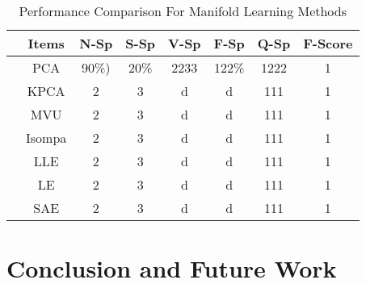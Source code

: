 \documentclass[journal]{IEEEtran}
\begin{document}
\begin{table}[!htbp]
\begin{center}
\begin{threeparttable}
\caption{Performance Comparison For Manifold Learning Methods}
\label{table1}
\begin{tabular}{cccccccc}
\hline
&  Items & N-Sp & S-Sp & V-Sp & F-Sp & Q-Sp & F-Score \\
\hline
& PCA  &90\%)  & 20\%  & 2233 & 122\%  &1222 & 1\\

& KPCA  &2 & 3  & d &d& 111   &1      \\

& MVU  &2 & 3  & d &d& 111   &1      \\


& Isompa  &2 & 3  & d &d& 111   &1      \\


& LLE  &2 & 3  & d &d& 111   &1      \\

& LE  &2 & 3  & d &d& 111   &1      \\

& SAE  &2 & 3  & d &d& 111   &1      \\


\hline
\end{tabular}
\end{threeparttable}
\end{center}
\end{table}
     
     


%
%

\section{Conclusion and Future Work}

\lipsum[1-2]













%
%
\end{document}
